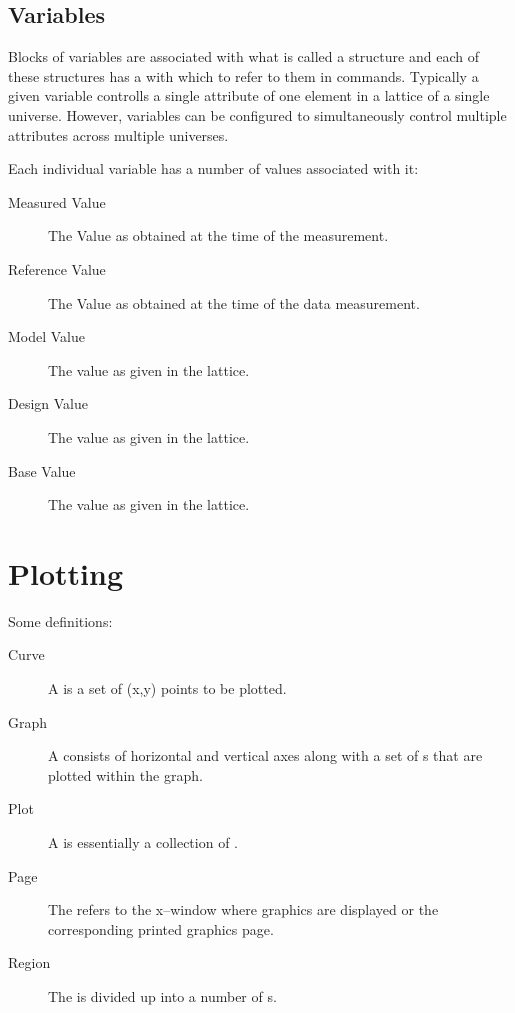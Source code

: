 \subsection{Variables}

Blocks of variables are associated with what is called a
 structure and each of these structures has a 
with which to refer to them in \tao commands. Typically a given variable 
controlls a single attribute of one element in a  lattice
of a single universe. However, variables can be configured to simultaneously
control multiple attributes across multiple universes.

Each individual variable has a number of values associated with it:
  \begin{description}
  \item[Measured Value] 
The Value as obtained at the time of the  measurement.
  \item[Reference Value] 
The Value as obtained at the time of the  data  measurement.
  \item[Model Value]
The value as given in the  lattice.
  \item[Design Value]
The value as given in the  lattice.
  \item[Base Value]
The value as given in the  lattice.
  \end{description}

\section{Plotting}

Some definitions:
\begin{description}
\item[Curve]
A  is a set of (x,y) points to be plotted.
\item[Graph]
A  consists of horizontal and vertical axes along with a set
of s that are plotted within the graph. 
\item[Plot]
A  is essentially a collection of .
\item[Page]
The  refers to the x--window where graphics are displayed or the 
corresponding printed graphics page.
\item[Region]
The  is divided up into a number of s. 
\end{description}

